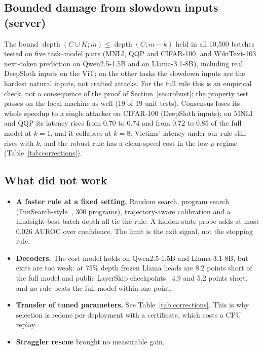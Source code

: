 \subsection{Bounded damage from slowdown inputs (server)}\label{sec:robust4}
The bound $\operatorname{depth}(C\cup K;m)\le\operatorname{depth}(C;m-k)$ held in all 10{,}500 batches tested on
five task--model pairs (MNLI, QQP and CIFAR-100, and WikiText-103 next-token prediction on Qwen2.5-1.5B and on
Llama-3.1-8B), including real DeepSloth inputs on the ViT; on the other tasks the slowdown inputs are the hardest
natural inputs, not crafted attacks. For the full rule this is an empirical check, not a consequence of the proof
of Section~\ref{sec:robust}; the property test passes on the local machine as well (19 of
19 unit tests). Consensus loses its whole speedup to a single attacker on CIFAR-100 (DeepSloth inputs); on MNLI and
QQP its latency rises from 0.70 to 0.74 and from 0.72 to 0.85 of the full model at $k=1$, and it collapses at
$k=8$. Victims'
latency under our rule still rises with $k$, and the robust rule has a clean-speed cost in the low-$\rho$ regime
(Table~\ref{tab:corrections}).

\subsection{What did not work}\label{sec:negative}
\begin{itemize}
  \item \textbf{A faster rule at a fixed setting.} Random search, program search (FunSearch-style~\cite{funsearch}, 300 programs),
  trajectory-aware calibration and a hindsight-best batch depth all tie the rule. A hidden-state probe adds at most
  0.026 AUROC over confidence. The limit is the exit signal, not the stopping rule.
  \item \textbf{Decoders.} The cost model holds on Qwen2.5-1.5B and Llama-3.1-8B, but exits are too weak: at 75\%
  depth frozen Llama heads are 8.2 points short of the full model and public LayerSkip checkpoints~\cite{layerskip}
  4.9 and 5.2 points short, and no rule beats the full model within one point.
  \item \textbf{Transfer of tuned parameters.} See Table~\ref{tab:corrections}. This is why selection is redone per
  deployment with a certificate, which costs a CPU replay.
  \item \textbf{Straggler rescue} brought no measurable gain.
\end{itemize}

